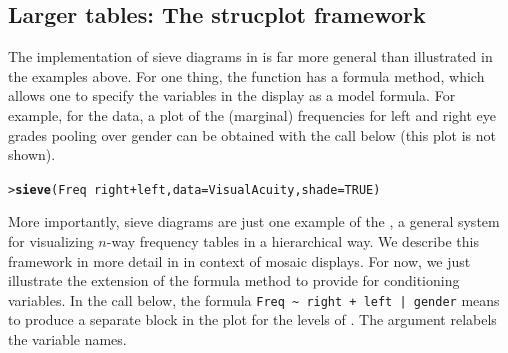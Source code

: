 \documentclass[10pt,krantz2]{krantz}\usepackage[]{graphicx}\usepackage[]{color}
\makeatletter
\newcommand{\hlnum}[1]{\textcolor[rgb]{0.686,0.059,0.569}{#1}}%
\newcommand{\hlopt}[1]{\textcolor[rgb]{0,0,0}{#1}}%
\newcommand{\hlstd}[1]{\textcolor[rgb]{0.345,0.345,0.345}{#1}}%
\newcommand{\hlkwc}[1]{\textcolor[rgb]{0.333,0.667,0.333}{#1}}%
\newcommand{\hlkwd}[1]{\textcolor[rgb]{0.737,0.353,0.396}{\textbf{#1}}}%
\newenvironment{kframe}{%
 \def\at@end@of@kframe{}%
 \ifinner\ifhmode%
  \def\at@end@of@kframe{\end{minipage}}%
  \begin{minipage}{\columnwidth}%
 \fi\fi%
 \def\FrameCommand##1{\hskip\@totalleftmargin \hskip-\fboxsep
 \colorbox{shadecolor}{##1}\hskip-\fboxsep
     \hskip-\linewidth \hskip-\@totalleftmargin \hskip\columnwidth}%
 \MakeFramed {\advance\hsize-\width
   \@totalleftmargin\z@ \linewidth\hsize
   \@setminipage}}%
 {\par\unskip\endMakeFramed%
 \at@end@of@kframe}
\newenvironment{knitrout}{}{} %
\renewenvironment{knitrout}{\small\renewcommand{\baselinestretch}{.85}}{} %
\makeatother
\begin{document}
\subsection{Larger tables: The strucplot framework}\label{sec:twoway-sieve-larger}
The implementation of sieve diagrams in  is far more
general than illustrated in the examples above.  For one thing,
the  function has a formula method, which allows one to specify
the variables in the display as a model formula.
For example, for the  data, a plot of
the (marginal) frequencies for left and right eye grades
pooling over gender can be obtained with the call below
(this plot is not shown).

\begin{knitrout}
\color{fgcolor}\begin{kframe}
\begin{alltt}
\hlstd{> }\hlkwd{sieve}\hlstd{(Freq} \hlopt{~} \hlstd{right} \hlopt{+} \hlstd{left,}  \hlkwc{data} \hlstd{= VisualAcuity,} \hlkwc{shade} \hlstd{=} \hlnum{TRUE}\hlstd{)}
\end{alltt}
\end{kframe}
\end{knitrout}

More importantly, sieve diagrams are just one example of
the , a general system for
visualizing $n$-way frequency tables in a hierarchical
way.  We describe this framework in more detail in
 in context of mosaic
displays.  For now, we just illustrate the extension of
the formula method to provide for conditioning variables.
In the call below, the formula \verb#Freq ~ right + left | gender#
means to produce a separate block in the plot for the levels of
. The  argument relabels the
variable names.
\end{document}
